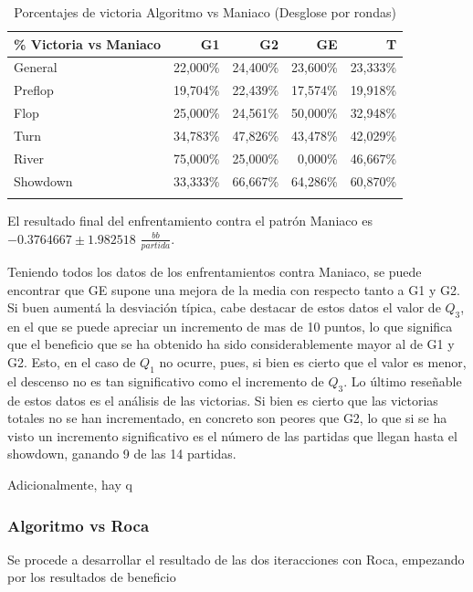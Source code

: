 \begin{longtable}[c]{lrrrr}
\hline
\% Victoria vs Maniaco & G1 & G2 & GE & T \\ \hline
General & 22,000\% & 24,400\% & 23,600\% & 23,333\% \\ 
Preflop & 19,704\% & 22,439\% & 17,574\% & 19,918\% \\ 
Flop & 25,000\% & 24,561\% & 50,000\% & 32,948\% \\ 
Turn & 34,783\% & 47,826\% & 43,478\% & 42,029\% \\ 
River & 75,000\% & 25,000\% & 0,000\% & 46,667\% \\ 
Showdown & 33,333\% & 66,667\% & 64,286\% & 60,870\% \\ \hline
\caption{Porcentajes de victoria Algoritmo vs Maniaco (Desglose por rondas)}
\label{tab:winrateM}
\end{longtable}

El resultado final del enfrentamiento contra el patrón Maniaco es $-0.3764667\pm1.982518$ $\frac{bb}{partida}$.

\vspace{5mm} %

Teniendo todos los datos de los enfrentamientos contra Maniaco, se puede encontrar que GE supone una mejora de la media con respecto tanto a G1 y G2. Si buen aumentá la desviación típica, cabe destacar de estos datos el valor de $Q_3$, en el que se puede apreciar un incremento de mas de 10 puntos, lo que significa que el beneficio que se ha obtenido ha sido considerablemente mayor al de G1 y G2. Esto, en el caso de $Q_1$ no ocurre, pues, si bien es cierto que el valor es menor, el descenso no es tan significativo como el incremento de $Q_3$. 
Lo último reseñable de estos datos es el análisis de las victorias. 
Si bien es cierto que las victorias totales no se han incrementado, en concreto son peores que G2, lo que si se ha visto un incremento significativo es el número de las partidas que llegan hasta el showdown, ganando 9 de las 14 partidas. 

Adicionalmente, hay q

\subsubsection{Algoritmo vs Roca}

Se procede a desarrollar el resultado de las dos iteracciones con Roca, empezando por los resultados de beneficio

